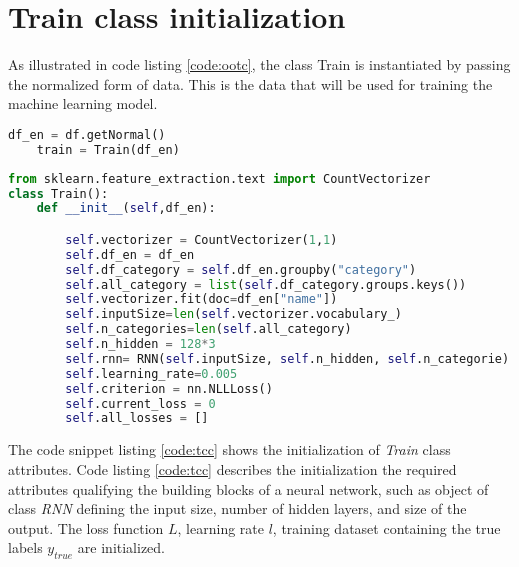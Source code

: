 \section{Train class initialization}
As illustrated in code listing \ref{code:ootc}, the class Train is instantiated by passing the normalized form of data. This is the data that will be used for training the machine learning model.
\begin{lstlisting}[language=Python,caption={Object of the Train class},label={code:ootc}]
    df_en = df.getNormal()
    train = Train(df_en)
\end{lstlisting}

\clearpage

\begin{lstlisting}[language=Python,caption={Train class constructor},label={code:tcc}]
from sklearn.feature_extraction.text import CountVectorizer
class Train():
    def __init__(self,df_en):

        self.vectorizer = CountVectorizer(1,1)
        self.df_en = df_en
        self.df_category = self.df_en.groupby("category")
        self.all_category = list(self.df_category.groups.keys())
        self.vectorizer.fit(doc=df_en["name"])
        self.inputSize=len(self.vectorizer.vocabulary_)
        self.n_categories=len(self.all_category)
        self.n_hidden = 128*3
        self.rnn= RNN(self.inputSize, self.n_hidden, self.n_categorie)
        self.learning_rate=0.005
        self.criterion = nn.NLLLoss()
        self.current_loss = 0
        self.all_losses = []
\end{lstlisting}

The code snippet listing \ref{code:tcc} shows the initialization of \textit{Train} class attributes. Code listing \ref{code:tcc} describes the  initialization the required attributes qualifying the building blocks of a neural network, such as object of class \textit{RNN} defining the input size, number of hidden layers, and size of the output. The loss function $L$, learning rate $l$, training dataset containing the true labels $y_{true}$ are initialized.

